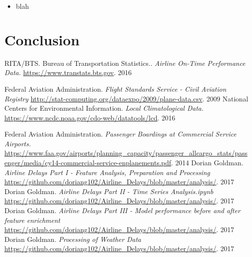 \documentclass[twocolumn,showpacs,%
  nofootinbib,aps,superscriptaddress,%
  eqsecnum,prd,notitlepage,showkeys,10pt]{revtex4-1}
\begin{document}
\begin{itemize}
\item blah
\end{itemize}




\section{Conclusion}




  \begin{thebibliography}{1}

   RITA/BTS. Bureau of Transportation Statistics.. {\em Airline On-Time Performance Data.} \url{https://www.transtats.bts.gov}. 2016

    Federal Aviation Administration.  {\em Flight Standards Service - Civil Aviation Registry} \url{http://stat-computing.org/dataexpo/2009/plane-data.csv}. 2009
    National Centers for Environmental Information. {\em Local Climatological Data.} \url{ https://www.ncdc.noaa.gov/cdo-web/datatools/lcd}. 2016

   Federal Aviation Administration. {\em Passenger Boardings at Commercial Service Airports. } \url{https://www.faa.gov/airports/planning_capacity/passenger_allcargo_stats/passenger/media/cy14-commercial-service-enplanements.pdf}. 2014
   Dorian Goldman. {\em Airline Delays Part I - Feature Analysis, Preparation and Processing } \url{https://github.com/doriang102/Airline_Delays/blob/master/analysis/}. 2017
 Dorian Goldman. {\em Airline Delays Part II - Time Series Analysis.ipynb } \url{https://github.com/doriang102/Airline_Delays/blob/master/analysis/}. 2017
 Dorian Goldman. {\em Airline Delays Part III - Model performance before and after feature enrichment } \url{https://github.com/doriang102/Airline_Delays/blob/master/analysis/}. 2017
 Dorian Goldman. {\em Processing of Weather Data} \url{https://github.com/doriang102/Airline_Delays/blob/master/analysis/}. 2017

  \end{thebibliography}
  
\end{document}
